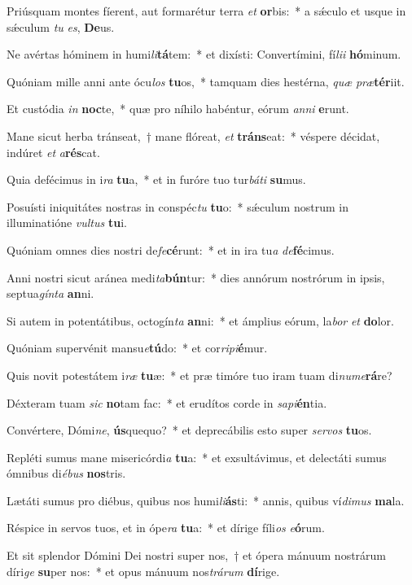 \item Priúsquam montes fíerent, aut formarétur terra \textit{et} \textbf{or}bis:~* a sǽculo et usque in sǽculum \textit{tu} \textit{es}, \textbf{De}us.
\item Ne avértas hóminem in humi\textit{li}\textbf{tá}tem:~* et dixísti: Convertímini, fí\textit{li}\textit{i} \textbf{hó}minum.
\item Quóniam mille anni ante ócu\textit{los} \textbf{tu}os,~* tamquam dies hestérna, \textit{quæ} \textit{præ}\textbf{tér}iit.
\item Et custódia \textit{in} \textbf{noc}te,~* quæ pro níhilo habéntur, eórum \textit{an}\textit{ni} \textbf{e}runt.
\item Mane sicut herba tránseat,~† mane flóreat, \textit{et} \textbf{tráns}eat:~* véspere décidat, indúret \textit{et} \textit{a}\textbf{rés}cat.
\item Quia defécimus in i\textit{ra} \textbf{tu}a,~* et in furóre tuo tur\textit{bá}\textit{ti} \textbf{su}mus.
\item Posuísti iniquitátes nostras in conspéc\textit{tu} \textbf{tu}o:~* sǽculum nostrum in illuminatióne \textit{vul}\textit{tus} \textbf{tu}i.
\item Quóniam omnes dies nostri de\textit{fe}\textbf{cé}runt:~* et in ira tu\textit{a} \textit{de}\textbf{fé}cimus.
\item Anni nostri sicut aránea medi\textit{ta}\textbf{bún}tur:~* dies annórum nostrórum in ipsis, septua\textit{gín}\textit{ta} \textbf{an}ni.
\item Si autem in potentátibus, octogín\textit{ta} \textbf{an}ni:~* et ámplius eórum, la\textit{bor} \textit{et} \textbf{do}lor.
\item Quóniam supervénit mansu\textit{e}\textbf{tú}do:~* et cor\textit{ri}\textit{pi}\textbf{é}mur.
\item Quis novit potestátem i\textit{ræ} \textbf{tu}æ:~* et præ timóre tuo iram tuam di\textit{nu}\textit{me}\textbf{rá}re?
\item Déxteram tuam \textit{sic} \textbf{no}tam fac:~* et erudítos corde in \textit{sa}\textit{pi}\textbf{én}tia.
\item Convértere, Dómi\textit{ne}, \textbf{ús}quequo?~* et deprecábilis esto super \textit{ser}\textit{vos} \textbf{tu}os.
\item Repléti sumus mane misericórdi\textit{a} \textbf{tu}a:~* et exsultávimus, et delectáti sumus ómnibus di\textit{é}\textit{bus} \textbf{nos}tris.
\item Lætáti sumus pro diébus, quibus nos humi\textit{li}\textbf{ás}ti:~* annis, quibus ví\textit{di}\textit{mus} \textbf{ma}la.
\item Réspice in servos tuos, et in ópe\textit{ra} \textbf{tu}a:~* et dírige fíli\textit{os} \textit{e}\textbf{ó}rum.
\item Et sit splendor Dómini Dei nostri super nos,~† et ópera mánuum nostrárum díri\textit{ge} \textbf{su}per nos:~* et opus mánuum nos\textit{trá}\textit{rum} \textbf{dí}rige.

